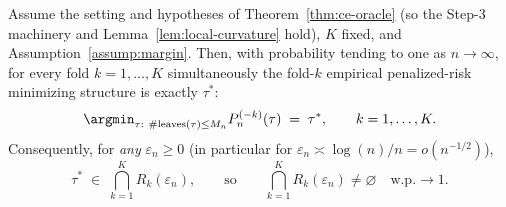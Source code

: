 \begin{theorem}
\label{thm:margin-recovery}
Assume the setting and hypotheses of Theorem~\ref{thm:ce-oracle} (so the
Step-3 machinery and Lemma~\ref{lem:local-curvature} hold), $K$ fixed,
and Assumption~\ref{assump:margin}. Then, with probability tending to one as
$n\to\infty$, for every fold $k=1,\dots,K$ simultaneously the fold-$k$ empirical
penalized-risk minimizing structure is exactly $\tau^\ast$:
\begin{equation}\label{eq:exact-recovery}
  \argmin_{\tau:\ \#\mathrm{leaves}(\tau)\le M_n} P_n^{(-k)}(\tau)
  \;=\; \tau^\ast,
  \qquad k=1,\dots,K.
\end{equation}
Consequently, for \emph{any} $\varepsilon_n\ge 0$ (in particular for
$\varepsilon_n\asymp \log(n)/n = o(n^{-1/2})$),
\begin{equation}\label{eq:nonempty}
  \tau^\ast \;\in\; \bigcap_{k=1}^{K} R_k(\varepsilon_n),
  \qquad\text{so}\qquad
  \bigcap_{k=1}^{K} R_k(\varepsilon_n)\neq\varnothing
  \quad\text{w.p.}\to 1.
\end{equation}
\end{theorem}


